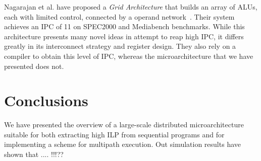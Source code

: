 \documentclass[10pt,dvips]{article}
\begin{document}
Nagarajan et al. have proposed a {\em Grid Architecture} that
builds an array of ALUs, each with limited control, connected
by a operand network~\cite{Nag01}.  Their system achieves an IPC of 11 on
SPEC2000 and Mediabench benchmarks.  While this architecture
presents many novel ideas in attempt to reap high IPC, it
differs greatly in its interconnect strategy and register design.
They also rely on a compiler to obtain this level of IPC, whereas
the microarchitecture that we have presented does not.
%
\section{Conclusions}
%
We have presented the overview of a large-scale distributed 
microarchitecture suitable for both extracting high ILP from
sequential programs and for implementing a scheme for
multipath execution.
Out simulation results have shown that .... !!!??




\end{document}
